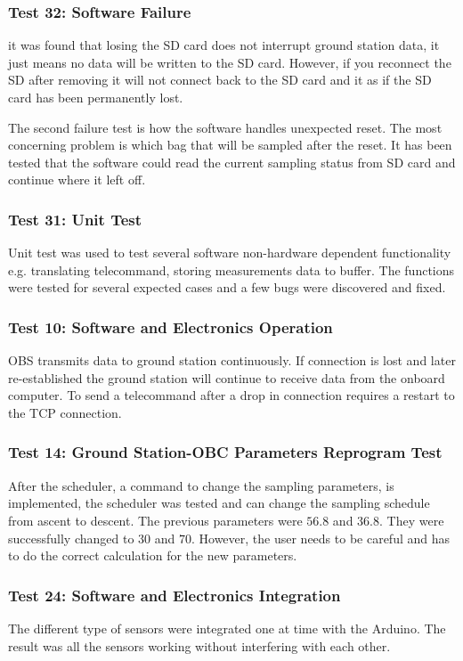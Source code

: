 \documentclass[a4paper,12pt,oneside]{article}
\begin{document}
\subsubsection{Test 32: Software Failure}

it was found that losing the SD card does not interrupt ground station data, it just means no data will be written to the SD card. However, if you reconnect the SD after removing it will not connect back to the SD card and it as if the SD card has been permanently lost.\par

The second failure test is how the software handles unexpected reset. The most concerning problem is which bag that will be sampled after the reset. It has been tested that the software could read the current sampling status from SD card and continue where it left off. 

\subsubsection{Test 31: Unit Test}
Unit test was used to test several software non-hardware dependent functionality e.g. translating telecommand, storing measurements data to buffer. The functions were tested for several expected cases and a few bugs were discovered and fixed.

\subsubsection{Test 10: Software and Electronics Operation}
OBS transmits data to ground station continuously. If connection is lost and later re-established the ground station will continue to receive data from the onboard computer. To send a telecommand after a drop in connection requires a restart to the TCP connection. 

\subsubsection{Test 14: Ground Station-OBC Parameters Reprogram Test}
After the scheduler, a command to change the sampling parameters, is implemented, the scheduler was tested and can change the sampling schedule from ascent to descent. The previous parameters were $56.8$ and $36.8$. They were successfully changed to $30$ and $70$. However, the user needs to be careful and has to do the correct calculation for the new parameters.

\subsubsection{Test 24: Software and Electronics Integration}
The different type of sensors were integrated one at time with the Arduino. The result was all the sensors working without interfering with each other.
\end{document}
